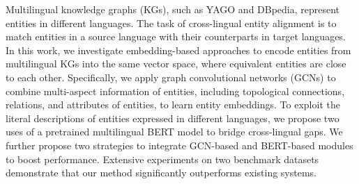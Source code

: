 Multilingual knowledge graphs (KGs), such as YAGO and DBpedia, represent entities in different languages.
The task of cross-lingual entity alignment is to match entities in a source language with their counterparts in target languages.
In this work, we investigate embedding-based approaches to encode entities from multilingual KGs into the same vector space, where equivalent entities are close to each other.
Specifically, we apply graph convolutional networks (GCNs) to combine multi-aspect information of entities, including topological connections, relations, and attributes of entities, to learn entity embeddings.
To exploit the literal descriptions of entities expressed in different languages, we propose two uses of a pretrained multilingual BERT model to bridge cross-lingual gaps.
We further propose two strategies to integrate GCN-based and BERT-based modules to boost performance.
Extensive experiments on two benchmark datasets demonstrate that our method significantly outperforms existing systems.